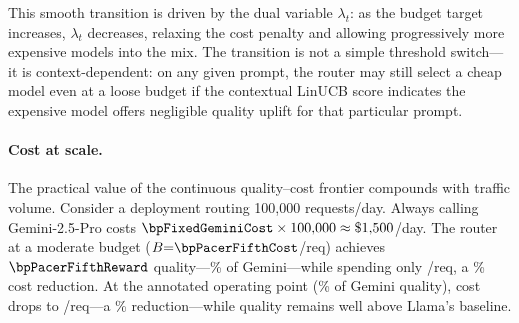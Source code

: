 This smooth transition is driven by the dual variable $\lambda_t$:
as the budget target increases, $\lambda_t$ decreases, relaxing
the cost penalty and allowing progressively more expensive models
into the mix.
The transition is not a simple threshold switch---it is
context-dependent: on any given prompt, the router may still
select a cheap model even at a loose budget if the contextual
LinUCB score indicates the expensive model offers negligible
quality uplift for that particular prompt.

\paragraph{Cost at scale.}
The practical value of the continuous quality--cost frontier
compounds with traffic volume.
Consider a deployment routing 100{,}000 requests/day.
Always calling Gemini-2.5-Pro costs
$\bpFixedGeminiCost \times 100{,}000 \approx \$1{,}500$/day.
The router at a moderate budget
($B{=}\bpPacerFifthCost$/req) achieves $\bpPacerFifthReward$
quality---\bpPacerFifthQualPctGemini\% of Gemini---while spending
only \bpPacerFifthCost/req, a
\bpPacerFifthSavingPctGemini\% cost reduction.
At the annotated operating point
(\bpAnnotQualPct\% of Gemini quality), cost drops to
\bpAnnotCost/req---a
\bpAnnotSavingPctGemini\% reduction---while quality remains
well above Llama's baseline.

